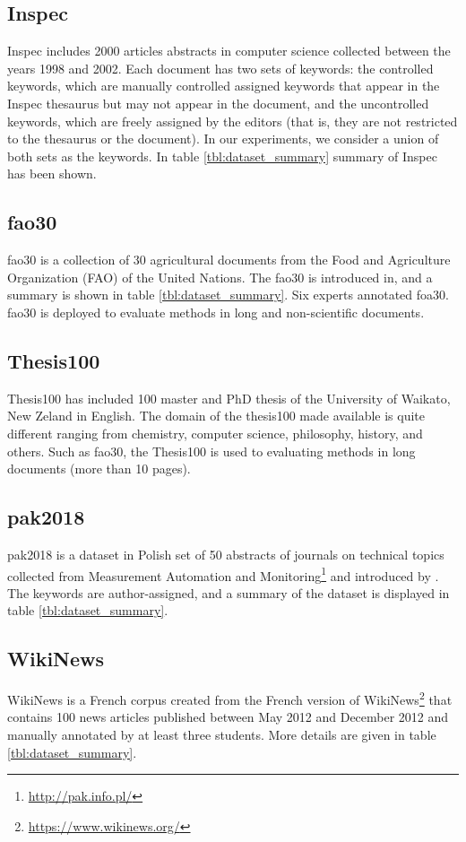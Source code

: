 \documentclass[3p]{elsarticle}
\begin{document}
\subsection*{Inspec}
Inspec\cite{Hulth2003} includes 2000 articles abstracts in computer science collected between the years 1998 and 2002. Each document has two sets of keywords: the controlled keywords, which are manually controlled assigned keywords that appear in the Inspec thesaurus but may not appear in the document, and the uncontrolled keywords, which are freely assigned by the editors (that is, they are not restricted to the thesaurus or the document). In our experiments, we consider a union of both sets as the keywords. In table \ref{tbl:dataset_summary} summary of Inspec has been shown.

\subsection*{fao30}
fao30 is a collection of 30 agricultural documents from the Food and Agriculture Organization (FAO) of the United Nations. The fao30 is introduced in\cite{Medelyan2006}, and a summary is shown in table \ref{tbl:dataset_summary}. Six experts annotated foa30. fao30 is deployed to evaluate methods in long and non-scientific documents.

\subsection*{Thesis100}
Thesis100\cite{medelyan_2015} has included 100 master and PhD thesis of the University of Waikato, New Zeland in English. The domain of the thesis100 made available is quite different ranging from chemistry, computer science, philosophy, history, and others. Such as fao30, the Thesis100 is used to evaluating methods in long documents (more than 10 pages).

\subsection*{pak2018}
pak2018 is a dataset in Polish set of 50 abstracts of journals on technical topics collected from Measurement Automation and Monitoring\footnote{\url{http://pak.info.pl/}} and introduced by \citet{Campos2020}. The keywords are author-assigned, and a summary of the dataset is displayed in table \ref{tbl:dataset_summary}.

\subsection*{WikiNews}
WikiNews\cite{Bougouin2013} is a French corpus created from the French version of WikiNews\footnote{\url{https://www.wikinews.org/}} that contains 100 news articles published between May 2012 and December 2012 and manually annotated by at least three students. More details are given in table \ref{tbl:dataset_summary}.
\end{document}
